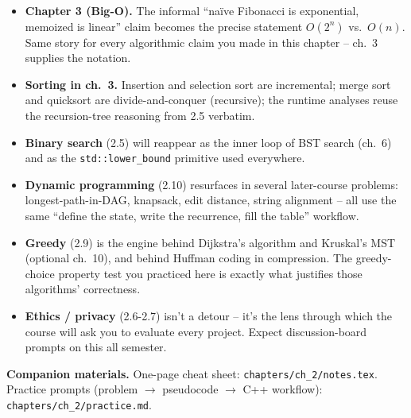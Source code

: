 \documentclass[11pt]{article}
\begin{document}
\begin{notebox}
\begin{itemize}
    \item \textbf{Chapter 3 (Big-O).} The informal ``na\"ive Fibonacci is
    exponential, memoized is linear'' claim becomes the precise
    statement $O(2^n)$ vs.\ $O(n)$. Same story for every algorithmic
    claim you made in this chapter -- ch.~3 supplies the notation.
    \item \textbf{Sorting in ch.~3.} Insertion and selection sort are
    incremental; merge sort and quicksort are divide-and-conquer
    (recursive); the runtime analyses reuse the recursion-tree reasoning
    from 2.5 verbatim.
    \item \textbf{Binary search} (2.5) will reappear as the inner loop
    of BST search (ch.~6) and as the \texttt{std::lower\_bound}
    primitive used everywhere.
    \item \textbf{Dynamic programming} (2.10) resurfaces in several
    later-course problems: longest-path-in-DAG, knapsack, edit
    distance, string alignment -- all use the same ``define the state,
    write the recurrence, fill the table'' workflow.
    \item \textbf{Greedy} (2.9) is the engine behind Dijkstra's algorithm
    and Kruskal's MST (optional ch.~10), and behind Huffman coding in
    compression. The greedy-choice property test you practiced here is
    exactly what justifies those algorithms' correctness.
    \item \textbf{Ethics / privacy} (2.6-2.7) isn't a detour -- it's the
    lens through which the course will ask you to evaluate every project.
    Expect discussion-board prompts on this all semester.
\end{itemize}
\end{notebox}

\textbf{Companion materials.} One-page cheat sheet:
\texttt{chapters/ch\_2/notes.tex}. Practice prompts (problem $\to$
pseudocode $\to$ C++ workflow): \texttt{chapters/ch\_2/practice.md}.
\end{document}
